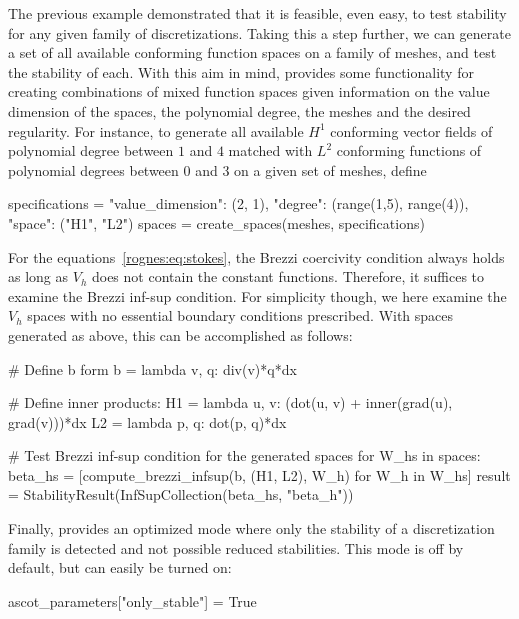 The previous example demonstrated that it is feasible, even easy, to
test stability for any given family of discretizations. Taking this a
step further, we can generate a set of all available conforming
function spaces on a family of meshes, and test the stability of
each. With this aim in mind, \rognesascot{} provides some
functionality for creating combinations of mixed function spaces given
information on the value dimension of the spaces, the polynomial
degree, the meshes and the desired regularity. For instance, to
generate all available $H^1$ conforming vector fields of polynomial
degree between $1$ and $4$ matched with $L^2$ conforming functions of
polynomial degrees between $0$ and $3$ on a given set of meshes,
define
\begin{python}
  specifications = {"value_dimension": (2, 1),
                    "degree": (range(1,5), range(4)),
                    "space": ("H1", "L2")}
  spaces = create_spaces(meshes, specifications)
\end{python}

For the equations~\eqref{rognes:eq:stokes}, the Brezzi coercivity
condition always holds as long as $V_h$ does not contain the constant
functions. Therefore, it suffices to examine the Brezzi inf-sup
condition. For simplicity though, we here examine the $V_h$ spaces
with no essential boundary conditions prescribed. With spaces
generated as above, this can be accomplished as follows:
\begin{python}
# Define b form
b = lambda v, q: div(v)*q*dx

# Define inner products:
H1 = lambda u, v: (dot(u, v) + inner(grad(u), grad(v)))*dx
L2 = lambda p, q: dot(p, q)*dx

# Test Brezzi inf-sup condition for the generated spaces
for W_hs in spaces:
    beta_hs = [compute_brezzi_infsup(b, (H1, L2), W_h) for W_h in W_hs]
    result = StabilityResult(InfSupCollection(beta_hs, "beta_h"))
\end{python}
Finally, \rognesascot{} provides an optimized mode where only the
stability of a discretization family is detected and not possible
reduced stabilities. This mode is off by default, but can easily be
turned on:
\begin{python}
 ascot_parameters["only_stable"] = True
\end{python}

